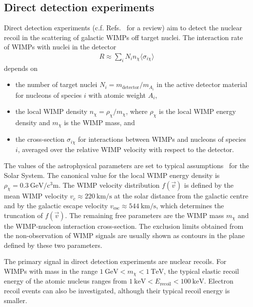 \subsection{Direct detection experiments}
\label{sec:dm:searches:dd}
Direct detection experiments (c.f. Refs.~\cite{Liu2017,Schumann2019} for a review) aim to detect the nuclear recoil in the scattering of galactic WIMPs off target nuclei. The interaction rate of WIMPs with nuclei in the detector~\cite{Bertone2005}
\begin{align}
    R \approx \sum_{i} N_{i} n_{\chi} \langle \sigma_{i \chi} \rangle
\end{align}
depends on
\begin{itemize}
    \item the number of target nuclei \(N_{i} = m_{\text{detector}} / m_{A_{i}}\) in the active detector material for nucleons of species \(i\) with atomic weight \(A_{i}\),
    \item the local WIMP density \(n_{\chi} = \rho_{\chi} / m_{\chi}\), where \(\rho_{\chi}\) is the local WIMP energy density and \(m_{\chi}\) is the WIMP mass, and
    \item the cross-section \(\sigma_{i \chi}\) for interactions between WIMPs and nucleons of species \(i\), averaged over the relative WIMP velocity with respect to the detector.
\end{itemize}
The values of the astrophysical parameters are set to typical assumptions~\cite{Schumann2019} for the Solar System. The canonical value for the local WIMP energy density is \(\rho_{\chi} = \SI{0.3}{\giga\electronvolt\per\cubic\centi\meter}\). The WIMP velocity distribution \(f(\vec{v})\) is defined by the mean WIMP velocity \(v_{c} \approx \SI{220}{\kilo\meter\per\second}\) at the solar distance from the galactic centre and by the galactic escape velocity \(v_{\text{esc}} \approx \SI{544}{\kilo\meter\per\second}\), which determines the truncation of \(f(\vec{v})\).
The remaining free parameters are the WIMP mass \(m_{\chi}\) and the WIMP-nucleon interaction cross-section. The exclusion limits obtained from the non-observation of WIMP signals are usually shown as contours in the plane defined by these two parameters.

The primary signal in direct detection experiments are nuclear recoils. For WIMPs with mass in the range \(\SI{1}{\giga\electronvolt} < m_{\chi} < \SI{1}{\tera\electronvolt}\), the typical elastic recoil energy of the atomic nucleus ranges from \(\SI{1}{\kilo\electronvolt} < E_{\text{recoil}} < \SI{100}{\kilo\electronvolt}\). Electron recoil events can also be investigated, although their typical recoil energy is smaller.

